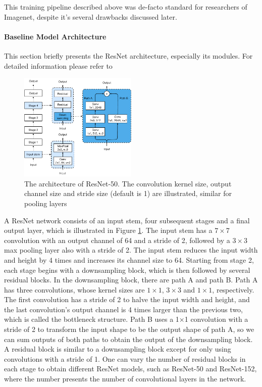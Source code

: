 This training pipeline described above was de-facto standard for researchers of Imagenet, despite it's several drawbacks discussed later. 

\paragraph{Baseline Model Architecture}
This section briefly presents the ResNet architecture, especially its modules. For detailed information please refer to \cite{he2016deep_resnetv1}


\begin{figure}[ht!]
    \centering
    \includegraphics[width=0.5\textwidth]{images/resnet-a.pdf}
    \caption{The architecture of ResNet-50. The convolution kernel size, output channel size and stride size (default is 1) are illustrated, similar for pooling layers}
    \label{fig: resnet-a}
  \end{figure}


A ResNet network consists of an input stem, four subsequent stages and a final output layer, which is illustrated in Figure \ref{fig: resnet-a}. The input stem has a $7 \times 7$ convolution with an output channel of 64 and a stride of 2, followed by a $3 \times 3$ max pooling layer also with a stride of 2. The input stem reduces the input width and height by 4 times and increases its channel size to 64. 
Starting from stage 2, each stage begins with a downsampling block, which is then followed by several residual blocks. In the downsampling block, there are path A and path B. Path A has three convolutions, whose kernel sizes are $1 \times 1$, $3 \times 3$ and $1 \times 1$, respectively. The first convolution has a stride of 2 to halve the input width and height, and the last convolution’s output channel is 4 times larger than the previous two, which is called the bottleneck structure. Path B uses a 1×1 convolution with a stride of 2 to transform the input shape to be the output shape of path A, so we can sum outputs of both paths to obtain the output of the downsampling block. A residual block is similar to a downsampling block except for only using convolutions with a stride of 1.
One can vary the number of residual blocks in each stage to obtain different ResNet models, such as ResNet-50 and ResNet-152, where the number presents the number of convolutional layers in the network.


